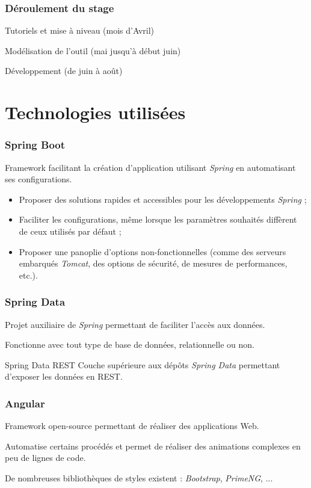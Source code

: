 \documentclass{beamer}
\begin{document}
\begin{frame}
\frametitle{Déroulement du stage}

Tutoriels et mise à niveau (mois d'Avril)

\bigbreak

Modélisation de l'outil (mai jusqu'à début juin)

\bigbreak

Développement (de juin à août)

\end{frame}

\section{Technologies utilisées}

\begin{frame}
\frametitle{Spring Boot}

Framework facilitant la création d'application utilisant \textit{Spring} en automatisant ses configurations.

\begin{itemize}
	\item Proposer des solutions rapides et accessibles pour les développements \textit{Spring} ;
	\item Faciliter les configurations, même lorsque les paramètres souhaités diffèrent de ceux utilisés par défaut ;
	\item Proposer une panoplie d'options non-fonctionnelles (comme des serveurs embarqués \textit{Tomcat}, des options de sécurité, de mesures de performances, etc.).
\end{itemize}
\end{frame}

\begin{frame}
\frametitle{Spring Data}

Projet auxiliaire de \textit{Spring} permettant de faciliter l'accès aux données.

\bigbreak

Fonctionne avec tout type de base de données, relationnelle ou non.

\begin{block}{Spring Data REST}
Couche supérieure aux dépôts \textit{Spring Data} permettant d'exposer les données en REST.
\end{block} 

\end{frame}

\begin{frame}
\frametitle{Angular}

Framework open-source permettant de réaliser des applications Web.

\bigbreak 

Automatise certains procédés et permet de réaliser des animations complexes en peu de lignes de code.

\bigbreak

De nombreuses bibliothèques de styles existent : \textit{Bootstrap}, \textit{PrimeNG}, ...

\end{frame}
\end{document}
